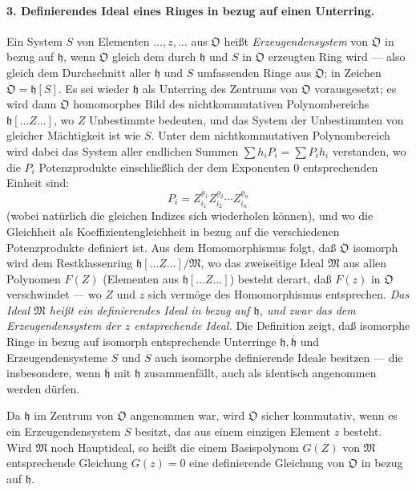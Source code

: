 \paragraph{3. Definierendes Ideal eines Ringes in bezug auf einen Unterring.}
Ein System $S$ von Elementen $\ldots,z,\ldots$ aus $\mathfrak O$ heißt \emph{Erzeugendensystem} von $\mathfrak O$ in bezug auf $\mathfrak h$, wenn $\mathfrak O$ gleich dem durch $\mathfrak h$ und $S$ in $\mathfrak O$ erzeugten Ring wird --- also gleich dem Durchschnitt aller $\mathfrak h$ und $S$ umfassenden Ringe aus $\mathfrak O$; in Zeichen $\mathfrak O=\mathfrak h[S]$. Es sei wieder $\mathfrak h$ als Unterring des Zentrums von $\mathfrak O$ vorausgesetzt; es wird dann $\mathfrak O$ homomorphes Bild des nichtkommutativen Polynombereichs $\mathfrak h[\ldots Z\ldots]$, wo $Z$ Unbestimmte bedeuten, und das System der Unbestimmten von gleicher Mächtigkeit ist wie $S$. Unter dem nichtkommutativen Polynombereich wird dabei das System aller endlichen Summen $\sum h_iP_i=\sum P_i h_i$ verstanden, wo die $P_i$ Potenzprodukte einschließlich der dem Exponenten $0$ entsprechenden Einheit sind:
\[
P_i=Z_{i_1}^{\varrho_1}Z_{i_2}^{\varrho_2}\cdots Z_{i_n}^{\varrho_n}
\]
(wobei natürlich die gleichen Indizes sich wiederholen können), und wo die Gleichheit als Koeffizientengleichheit in bezug auf die verschiedenen Potenzprodukte definiert ist. Aus dem Homomorphismus folgt, daß $\mathfrak O$ isomorph wird dem Restklassenring $\mathfrak h[\ldots Z\ldots]/\mathfrak M$, wo das zweiseitige Ideal $\mathfrak M$ aus allen Polynomen $F(Z)$ (Elementen aus $\mathfrak h[\ldots Z\ldots]$) besteht derart, daß $F(z)$ in $\mathfrak O$ verschwindet --- wo $Z$ und $z$ sich vermöge des Homomorphismus entsprechen. \emph{Das Ideal $\mathfrak M$ heißt ein definierendes Ideal in bezug auf $\mathfrak h$, und zwar das dem Erzeugendensystem der $z$ entsprechende Ideal.} Die Definition zeigt, daß isomorphe Ringe in bezug auf isomorph entsprechende Unterringe $\mathfrak h,\overline{\mathfrak h}$ und Erzeugendensysteme $S$ und $\overline S$ auch isomorphe definierende Ideale besitzen --- die insbesondere, wenn $\overline{\mathfrak h}$ mit $\mathfrak h$ zusammenfällt, auch als identisch angenommen werden dürfen.

Da $\mathfrak h$ im Zentrum von $\mathfrak O$ angenommen war, wird $\mathfrak O$ sicher kommutativ, wenn es ein Erzeugendensystem $S$ besitzt, das aus einem einzigen Element $z$ besteht. Wird $\mathfrak M$ noch Hauptideal, so heißt die einem Basispolynom $G(Z)$ von $\mathfrak M$ entsprechende Gleichung $G(z)=0$ eine definierende Gleichung von $\mathfrak O$ in bezug auf $\mathfrak h$.

